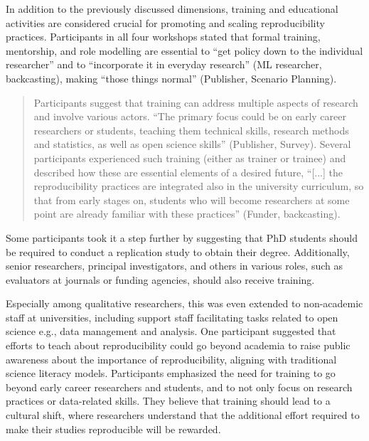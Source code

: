 \documentclass[authordate, meta]{jote-new-article}
\begin{document}
	In addition to the previously discussed dimensions, training and educational activities are considered crucial for promoting and scaling reproducibility practices. Participants in all four workshops stated that formal training, mentorship, and role modelling are essential to “get policy down to the individual researcher” and to “incorporate it in everyday research” (ML researcher, backcasting), making “those things normal” (Publisher, Scenario Planning).

	\begin{quote}
		Participants suggest that training can address multiple aspects of research and involve various actors. “The primary focus could be on early career researchers or students, teaching them technical skills, research methods and statistics, as well as open science skills” (Publisher, Survey). Several participants experienced such training (either as trainer or trainee) and described how these are essential elements of a desired future, “[...] the reproducibility practices are integrated also in the university curriculum, so that from early stages on, students who will become researchers at some point are already familiar with these practices” (Funder, backcasting).
	\end{quote}

	Some participants took it a step further by suggesting that PhD students should be required to conduct a replication study to obtain their degree. Additionally, senior researchers, principal investigators, and others in various roles, such as evaluators at journals or funding agencies, should also receive training.



	Especially among qualitative researchers, this was even extended to non-academic staff at universities, including support staff facilitating tasks related to open science e.g., data management and analysis. One participant suggested that efforts to teach about reproducibility could go beyond academia to raise public awareness about the importance of reproducibility, aligning with traditional science literacy models. Participants emphasized the need for training to go beyond early career researchers and students, and to not only focus on research practices or data-related skills. They believe that training should lead to a cultural shift, where researchers understand that the additional effort required to make their studies reproducible will be rewarded.
\end{document}
